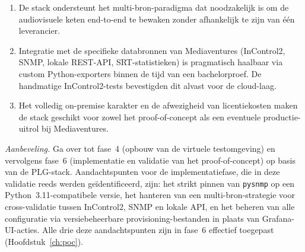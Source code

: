 \begin{enumerate}
  \item De stack ondersteunt het multi-bron-paradigma dat noodzakelijk is om de audiovisuele keten end-to-end te bewaken zonder afhankelijk te zijn van één leverancier.
  \item Integratie met de specifieke databronnen van Mediaventures (InControl2, SNMP, lokale REST-API, SRT-statistieken) is pragmatisch haalbaar via custom Python-exporters binnen de tijd van een bachelorproef. De handmatige InControl2-tests bevestigden dit alvast voor de cloud-laag.
  \item Het volledig on-premise karakter en de afwezigheid van licentiekosten maken de stack geschikt voor zowel het proof-of-concept als een eventuele productie-uitrol bij Mediaventures.
\end{enumerate}

\emph{Aanbeveling.} Ga over tot fase~4 (opbouw van de virtuele testomgeving) en vervolgens fase~6 (implementatie en validatie van het proof-of-concept) op basis van de PLG-stack. Aandachtspunten voor de implementatiefase, die in deze validatie reeds werden geïdentificeerd, zijn: het strikt pinnen van \texttt{pysnmp} op een Python~3.11-compatibele versie, het hanteren van een multi-bron-strategie voor cross-validatie tussen InControl2, SNMP en lokale API, en het beheren van alle configuratie via versiebeheerbare provisioning-bestanden in plaats van Grafana-UI-acties. Alle drie deze aandachtspunten zijn in fase~6 effectief toegepast (Hoofdstuk~\ref{ch:poc}).
